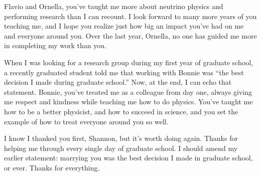 Flavio and Ornella, you've taught me more about neutrino physics and performing research than I can recount.  I look forward to many more years of you teaching me, and I hope you realize just how big an impact you've had on me and everyone around you.  Over the last year, Ornella, no one has guided me more in completing my work than you.

When I was looking for a research group during my first year of graduate school, a recently graduated student told me that working with Bonnie was ``the best decision I made during graduate school.''  Now, at the end, I can echo that statement.  Bonnie, you've treated me as a colleague from day one, always giving me respect and kindness while teaching me how to do physics. You've taught me how to be a better physicist, and how to succeed in science, and you set the example of how to treat everyone around you so well.

I know I thanked you first, Shannon, but it's worth doing again.  Thanks for helping me through every single day of graduate school.  I should amend my earlier statement: marrying you was the best decision I made in graduate school, or ever.  Thanks for everything.
